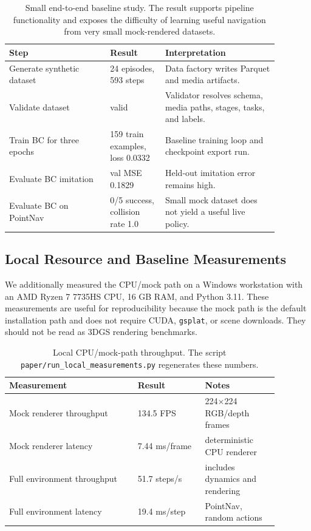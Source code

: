\documentclass[11pt]{article}
\begin{document}
\begin{table}[t]
\centering
\begin{tabular}{p{0.33\linewidth}p{0.18\linewidth}p{0.37\linewidth}}
\toprule
Step & Result & Interpretation \\
\midrule
Generate synthetic dataset & 24 episodes, 593 steps & Data factory writes Parquet and media artifacts. \\
Validate dataset & valid & Validator resolves schema, media paths, stages, tasks, and labels. \\
Train BC for three epochs & 159 train examples, loss 0.0332 & Baseline training loop and checkpoint export run. \\
Evaluate BC imitation & val MSE 0.1829 & Held-out imitation error remains high. \\
Evaluate BC on PointNav & 0/5 success, collision rate 1.0 & Small mock dataset does not yield a useful live policy. \\
\bottomrule
\end{tabular}
\caption{Small end-to-end baseline study. The result supports pipeline functionality and exposes the difficulty of learning useful navigation from very small mock-rendered datasets.}
\label{tab:smoke}
\end{table}

\subsection{Local Resource and Baseline Measurements}

We additionally measured the CPU/mock path on a Windows workstation with an AMD Ryzen 7 7735HS CPU, 16 GB RAM, and Python 3.11. These measurements are useful for reproducibility because the mock path is the default installation path and does not require CUDA, \texttt{gsplat}, or scene downloads. They should not be read as 3DGS rendering benchmarks.

\begin{table}[t]
\centering
\begin{tabular}{p{0.42\linewidth}p{0.22\linewidth}p{0.24\linewidth}}
\toprule
Measurement & Result & Notes \\
\midrule
Mock renderer throughput & 134.5 FPS & 224$\times$224 RGB/depth frames \\
Mock renderer latency & 7.44 ms/frame & deterministic CPU renderer \\
Full environment throughput & 51.7 steps/s & includes dynamics and rendering \\
Full environment latency & 19.4 ms/step & PointNav, random actions \\
\bottomrule
\end{tabular}
\caption{Local CPU/mock-path throughput. The script \texttt{paper/run\_local\_measurements.py} regenerates these numbers.}
\label{tab:throughput}
\end{table}
\end{document}
